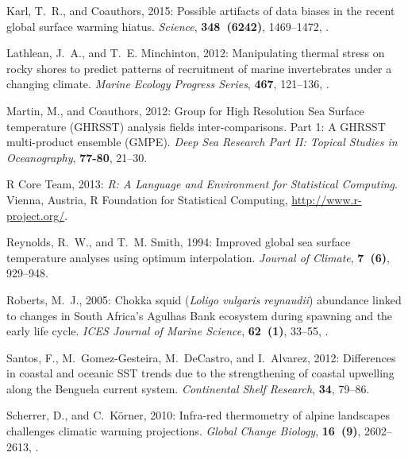\documentclass{ametsoc}
\begin{document}
\begin{thebibliography}{23}
Karl, T.~R., and Coauthors, 2015: {Possible artifacts of data biases in the
  recent global surface warming hiatus}. \textit{Science}, \textbf{348~(6242)},
  1469--1472, .

Lathlean, J.~A., and T.~E. Minchinton, 2012: {Manipulating thermal stress on
  rocky shores to predict patterns of recruitment of marine invertebrates under
  a changing climate}. \textit{Marine Ecology Progress Series}, \textbf{467},
  121--136, .

Martin, M., and Coauthors, 2012: {Group for High Resolution Sea Surface
  temperature (GHRSST) analysis fields inter-comparisons. Part 1: A GHRSST
  multi-product ensemble (GMPE)}. \textit{Deep Sea Research Part II: Topical
  Studies in Oceanography}, \textbf{77-80}, 21--30.


{R Core Team}, 2013: \textit{{R: A Language and Environment for Statistical
  Computing}}. Vienna, Austria, R Foundation for Statistical Computing,
  \urlprefix\url{http://www.r-project.org/}.

Reynolds, R.~W., and T.~M. Smith, 1994: {Improved global sea surface
  temperature analyses using optimum interpolation}. \textit{Journal of
  Climate}, \textbf{7~(6)}, 929--948.

Roberts, M.~J., 2005: {Chokka squid (\textit{Loligo vulgaris reynaudii}) abundance
  linked to changes in South Africa's Agulhas Bank ecosystem during spawning
  and the early life cycle}. \textit{ICES Journal of Marine Science},
  \textbf{62~(1)}, 33--55, .

Santos, F., M.~Gomez-Gesteira, M.~DeCastro, and I.~Alvarez, 2012: {Differences
  in coastal and oceanic SST trends due to the strengthening of coastal
  upwelling along the Benguela current system}. \textit{Continental Shelf
  Research}, \textbf{34}, 79--86.

Scherrer, D., and C.~K{\"{o}}rner, 2010: {Infra-red thermometry of alpine
  landscapes challenges climatic warming projections}. \textit{Global Change
  Biology}, \textbf{16~(9)}, 2602--2613,
  .


\end{thebibliography}
\end{document}
